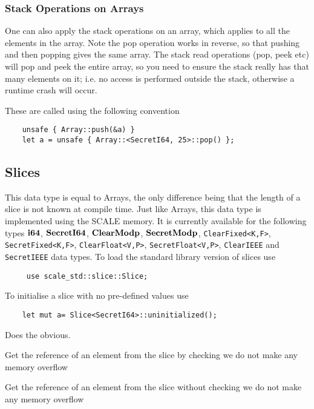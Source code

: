 \subsubsection{Stack Operations on Arrays}
One can also apply the stack operations on an array, which
applies to all the elements in the array.
Note the pop operation works in reverse, so that pushing and
then popping gives the same array.
The stack read operations (pop, peek etc) will pop and peek
the entire array, so you need to ensure the stack really has
that many elements on it; i.e. no access is performed outside
the stack, otherwise a runtime crash will occur.

These are called using the following convention
\begin{lstlisting}
    unsafe { Array::push(&a) }
    let a = unsafe { Array::<SecretI64, 25>::pop() };
\end{lstlisting}

\subsection{Slices}
\label{sec:slices}
This data type is equal to Arrays, the only difference being that the length of a slice is not known at compile time.
Just like Arrays, this data type is implemented using the SCALE memory.
It is currently available for the following types
$\mathbf{i64}$, $\mathbf{SecretI64}$, $\mathbf{ClearModp}$, $\mathbf{SecretModp}$,
\verb|ClearFixed<K,F>|, \verb|SecretFixed<K,F>|,
\verb|ClearFloat<V,P>|, \verb|SecretFloat<V,P>|,
\verb|ClearIEEE| and \verb|SecretIEEE|
data types.
To load the standard library version of slices use
\begin{lstlisting}
     use scale_std::slice::Slice;
\end{lstlisting}

To initialise a slice with no pre-defined values use
\begin{lstlisting}
    let mut a= Slice<SecretI64>::uninitialized();
\end{lstlisting}

Does the obvious.


Get the reference of an element from the slice by checking we do not make any memory overflow

Get the reference of an element from the slice without checking we do not make any memory overflow

